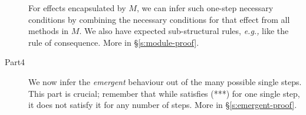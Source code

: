 \begin{description}
For effects encapsulated by $M$, we can infer such one-step
necessary conditions by combining the necessary conditions for that effect from 
all   methods in $M$. We also have  expected sub-structural rules, \emph{e.g.,} 
 like the rule of consequence.
More in \S\ref{s:module-proof}.



\item[Part4]
  
We now infer the \emph{emergent} behaviour out of the many possible 
single steps.  This part is crucial;   remember that while  satisfies  
(***) for one single step, it does not satisfy it for any number of steps. More in \S\ref{s:emergent-proof}.
 
\end{description} 
